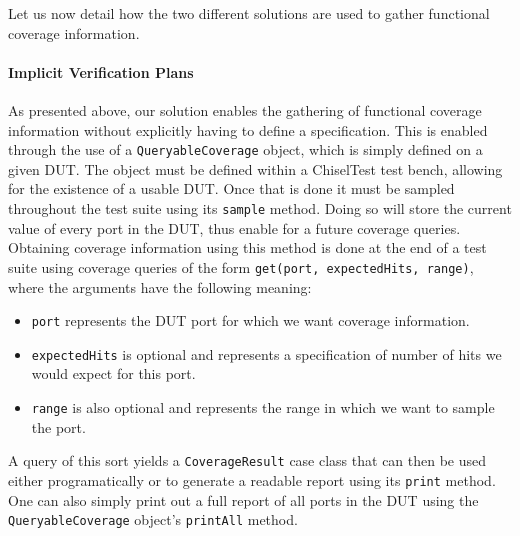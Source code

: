 \documentclass[conference]{IEEEtran}
\begin{document}
Let us now detail how the two different solutions are used to gather functional coverage information.

\paragraph{Implicit Verification Plans} As presented above, our solution enables the gathering of functional coverage information without explicitly having to define a specification.
This is enabled through the use of a \texttt{QueryableCoverage} object, which is simply defined on a given DUT.
The object must be defined within a ChiselTest test bench, allowing for the existence of a usable DUT.
Once that is done it must be sampled throughout the test suite using its \texttt{sample} method.
Doing so will store the current value of every port in the DUT, thus enable for a future coverage queries.
Obtaining coverage information using this method is done at the end of a test suite using coverage queries of the form \texttt{get(port, expectedHits, range)}, where the arguments have the following meaning:
\begin{itemize}
	\item \texttt{port} represents the DUT port for which we want coverage information.
	\item \texttt{expectedHits} is optional and represents a specification of number of hits we would expect for this port.
	\item \texttt{range} is also optional and represents the range in which we want to sample the port.
\end{itemize}
A query of this sort yields a \texttt{CoverageResult} case class that can then be used either programatically or to generate a readable report using its \texttt{print} method.
One can also simply print out a full report of all ports in the DUT using the \texttt{QueryableCoverage} object's \texttt{printAll} method.
\end{document}
